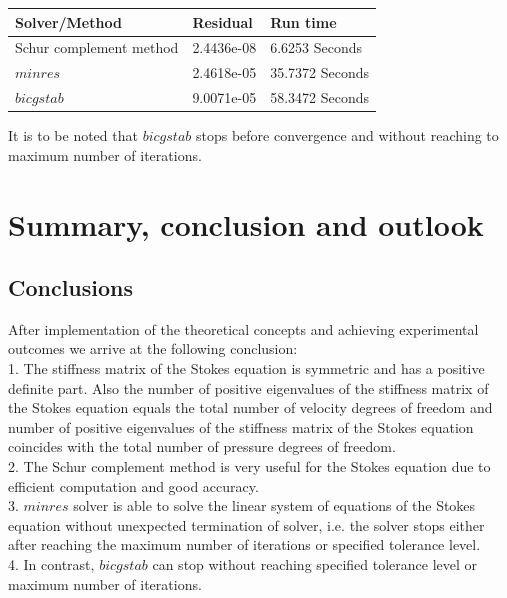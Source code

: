 \documentclass[a4paper]{book}
\begin{document}
\begin{longtable}{| p{} | p{} | p{} |}
\hline
\textbf{Solver/Method} & \textbf{Residual} & \textbf{Run time}\\
\hline
Schur complement method & 2.4436e-08 & 6.6253 Seconds\\
\hline
$minres$ & 2.4618e-05 & 35.7372 Seconds\\
\hline
$bicgstab$ & 9.0071e-05 & 58.3472 Seconds\\
\hline
\end{longtable}

It is to be noted that $bicgstab$ stops before convergence and without reaching to maximum number of iterations.

\chapter{Summary, conclusion and outlook}

\section{Conclusions}

After implementation of the theoretical concepts and achieving experimental outcomes we arrive at the following conclusion: \\

1. The stiffness matrix of the Stokes equation is symmetric and has a positive definite part. Also the number of positive eigenvalues of the stiffness matrix of the Stokes equation equals the total number of velocity degrees of freedom and number of positive eigenvalues of the stiffness matrix of the Stokes equation coincides with the total number of pressure degrees of freedom.\\

2. The Schur complement method is very useful for the Stokes equation due to efficient computation and good accuracy. \\

3. $minres$ solver is able to solve the linear system of equations of the Stokes equation without unexpected termination of solver, i.e. the solver stops either after reaching the maximum number of iterations or specified tolerance level.\\

4. In contrast, $bicgstab$ can stop without reaching specified tolerance level or maximum number of iterations.\\
\end{document}
